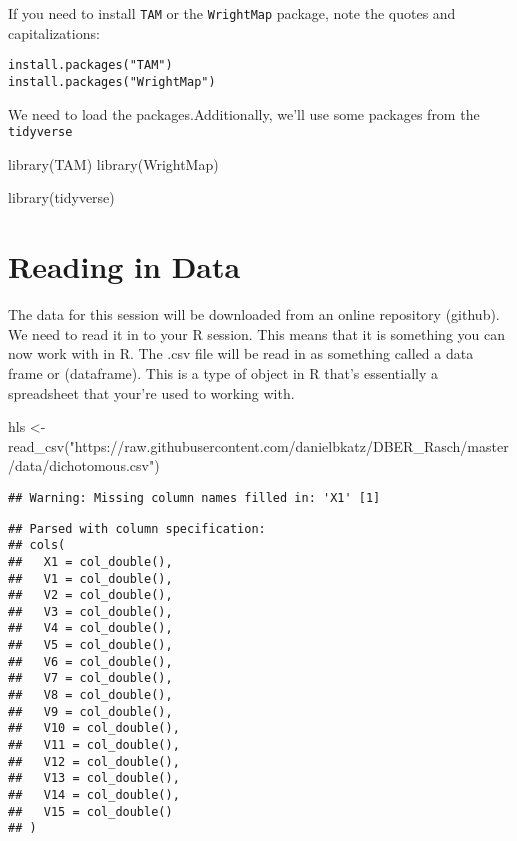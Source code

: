 \documentclass[
]{book}
\newenvironment{Shaded}{\begin{snugshade}}{\end{snugshade}}
\newcommand{\FunctionTok}[1]{\textcolor[rgb]{0.00,0.00,0.00}{#1}}
\newcommand{\NormalTok}[1]{#1}
\newcommand{\OtherTok}[1]{\textcolor[rgb]{0.56,0.35,0.01}{#1}}
\newcommand{\StringTok}[1]{\textcolor[rgb]{0.31,0.60,0.02}{#1}}
\begin{document}
If you need to install \texttt{TAM} or the \texttt{WrightMap} package, note the quotes and capitalizations:

\begin{verbatim}
install.packages("TAM")
install.packages("WrightMap")
\end{verbatim}

We need to load the packages.Additionally, we'll use some packages from the \texttt{tidyverse}

\begin{Shaded}
\begin{Highlighting}[]
\FunctionTok{library}\NormalTok{(TAM)}
\FunctionTok{library}\NormalTok{(WrightMap)}

\FunctionTok{library}\NormalTok{(tidyverse)}
\end{Highlighting}
\end{Shaded}

\hypertarget{reading-in-data}{%
\section{Reading in Data}\label{reading-in-data}}

The data for this session will be downloaded from an online repository (github). We need to read it in to your R session. This means that it is something you can now work with in R. The .csv file will be read in as something called a data frame or (dataframe). This is a type of object in R that's essentially a spreadsheet that your're used to working with.

\begin{Shaded}
\begin{Highlighting}[]
\NormalTok{hls }\OtherTok{\textless{}{-}} \FunctionTok{read\_csv}\NormalTok{(}\StringTok{"https://raw.githubusercontent.com/danielbkatz/DBER\_Rasch/master/data/dichotomous.csv"}\NormalTok{)}
\end{Highlighting}
\end{Shaded}

\begin{verbatim}
## Warning: Missing column names filled in: 'X1' [1]
\end{verbatim}

\begin{verbatim}
## Parsed with column specification:
## cols(
##   X1 = col_double(),
##   V1 = col_double(),
##   V2 = col_double(),
##   V3 = col_double(),
##   V4 = col_double(),
##   V5 = col_double(),
##   V6 = col_double(),
##   V7 = col_double(),
##   V8 = col_double(),
##   V9 = col_double(),
##   V10 = col_double(),
##   V11 = col_double(),
##   V12 = col_double(),
##   V13 = col_double(),
##   V14 = col_double(),
##   V15 = col_double()
## )
\end{verbatim}
\end{document}
